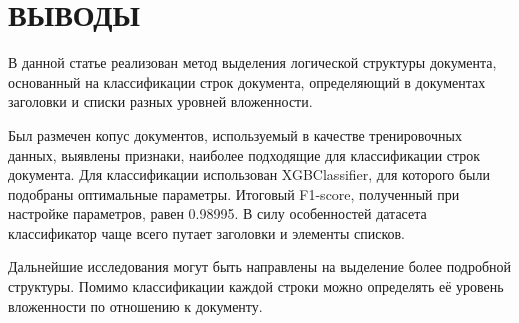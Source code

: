 \documentclass[10pt, a4paper]{ieeeconf}
\begin{document}
\section{ВЫВОДЫ}

В данной статье реализован метод выделения логической структуры документа, основанный на классификации строк документа, определяющий в документах заголовки и списки разных уровней вложенности.

Был размечен копус документов, используемый в качестве тренировочных данных, выявлены признаки, наиболее подходящие для классификации строк документа. Для классификации использован XGBClassifier, для которого были подобраны оптимальные параметры. Итоговый F1-score, полученный при настройке параметров, равен 0.98995. В силу особенностей датасета классификатор чаще всего путает заголовки и элементы списков.

Дальнейшие исследования могут быть направлены на выделение более подробной структуры. Помимо классификации каждой строки можно определять её уровень вложенности по отношению к документу.
\end{document}
